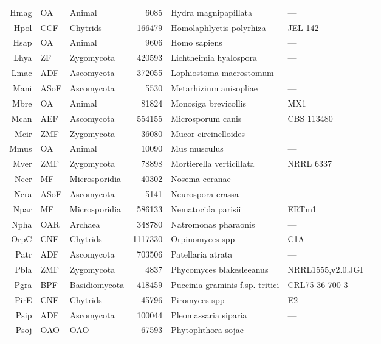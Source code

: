{{{\begin{longtable}{rllrlll}
  Hmag & OA & Animal & 6085 & Hydra magnipapillata & --- & \cite{Hmag} \\ 
  Hpol & CCF & Chytrids & 166479 & Homolaphlyctis polyrhiza & JEL 142 & \cite{Hpol} \\ 
  Hsap & OA & Animal & 9606 & Homo sapiens & --- & \cite{Hsap} \\ 
  Lhya & ZF & Zygomycota & 420593 & Lichtheimia hyalospora & --- & \cite{Lhya} \\ 
  Lmac & ADF & Ascomycota & 372055 & Lophiostoma macrostomum & --- & \cite{Lmac} \\ 
  Mani & ASoF & Ascomycota & 5530 & Metarhizium anisopliae & --- & \cite{Mani} \\ 
  Mbre & OA & Animal & 81824 & Monosiga brevicollis & MX1 & \cite{Mbre} \\ 
  Mcan & AEF & Ascomycota & 554155 & Microsporum canis & CBS 113480 & \cite{Mcan} \\ 
  Mcir & ZMF & Zygomycota & 36080 & Mucor circinelloides & --- & \cite{Mcir} \\ 
  Mmus & OA & Animal & 10090 & Mus musculus & --- & \cite{Mmus} \\ 
  Mver & ZMF & Zygomycota & 78898 & Mortierella verticillata & NRRL 6337 & \cite{Mver} \\ 
  Ncer & MF & Microsporidia & 40302 & Nosema ceranae & --- & \cite{Ncer} \\ 
  Ncra & ASoF & Ascomycota & 5141 & Neurospora crassa & --- & \cite{Ncra} \\ 
  Npar & MF & Microsporidia & 586133 & Nematocida parisii & ERTm1 & \cite{Npar} \\ 
  Npha & OAR & Archaea & 348780 & Natromonas pharaonis & --- & \cite{Npha} \\ 
  OrpC & CNF & Chytrids & 1117330 & Orpinomyces spp & C1A & \cite{OrpC} \\ 
  Patr & ADF & Ascomycota & 703506 & Patellaria atrata & --- & \cite{Patr} \\ 
  Pbla & ZMF & Zygomycota & 4837 & Phycomyces blakesleeanus & NRRL1555,v2.0.JGI & \cite{Pbla} \\ 
  Pgra & BPF & Basidiomycota & 418459 & Puccinia graminis f.sp. tritici & CRL75-36-700-3 & \cite{Pgra} \\ 
  PirE & CNF & Chytrids & 45796 & Piromyces spp  & E2 & \cite{PirE} \\ 
  Psip & ADF & Ascomycota & 100044 & Pleomassaria siparia & --- & \cite{Psip} \\ 
  Psoj & OAO & OAO & 67593 & Phytophthora sojae & --- & \cite{Psoj} \\ 

\end{longtable}}}}
